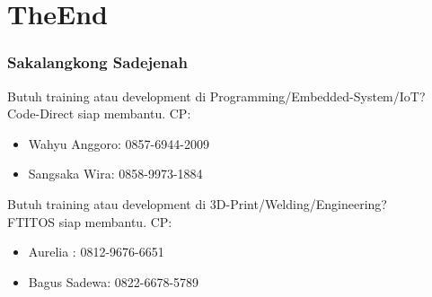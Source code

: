 \documentclass[table,dvipsnames]{beamer}
\begin{document}
	\section{TheEnd}
	\begin{frame}
		\frametitle{Sakalangkong Sadejenah}
		\begin{exampleblock}{}
			Butuh training atau development di Programming/Embedded-System/IoT?\\
			Code-Direct siap membantu. CP:
			\begin{itemize}
				\item Wahyu Anggoro: 0857-6944-2009
				\item Sangsaka Wira: 0858-9973-1884
			\end{itemize}
		\end{exampleblock}

		\begin{exampleblock}{}
			Butuh training atau development di 3D-Print/Welding/Engineering?\\
			FTITOS siap membantu. CP:
			\begin{itemize}
				\item Aurelia     : 0812-9676-6651
				\item Bagus Sadewa: 0822-6678-5789
			\end{itemize}
		\end{exampleblock}
	\end{frame}
\end{document}
